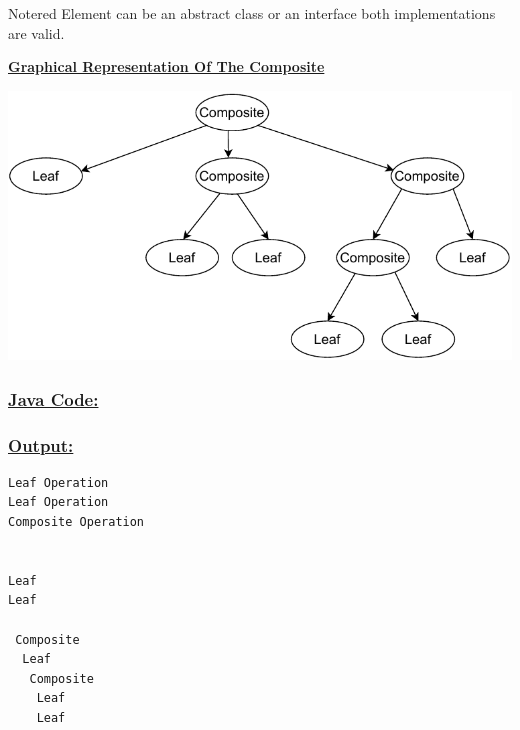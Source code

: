 \vspace{0.5cm}
\begin{prettyBox}{Note}{red}
Element can be an abstract class or an interface both implementations are valid.
\end{prettyBox}

\newpage
\textbf{\underline{Graphical Representation Of The Composite}}

\vspace{0.25cm}
\begin{center}
\includegraphics[height=0.3\textheight]{Chapters/DesignPattern/Composite/tree.drawio.pdf}
\end{center}



\vspace{1cm}
\subsubsection*{\underline{Java Code:}}



\vspace{0.5cm}

\newpage
\null
\vspace{1cm}


\newpage


\vspace{1cm}

\subsubsection*{\underline{Output:}}
\begin{lstlisting}[style=cmd]
Leaf Operation
Leaf Operation
Composite Operation


Leaf
Leaf

 Composite
  Leaf
   Composite
    Leaf
    Leaf
\end{lstlisting}


